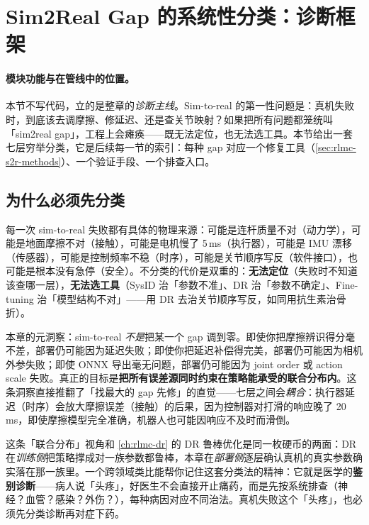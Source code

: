 \section{Sim2Real Gap 的系统性分类：诊断框架}
\label{sec:rlmc-s2r-taxonomy}

\paragraph{模块功能与在管线中的位置。}本节不写代码，立的是整章的\emph{诊断主线}。Sim-to-real 的第一性问题是：真机失败时，到底该去调摩擦、修延迟、还是查关节映射？如果把所有问题都笼统叫「sim2real gap」，工程上会瘫痪——既无法定位，也无法选工具。本节给出一套七层穷举分类，它是后续每一节的索引：每种 gap 对应一个修复工具（\cref{sec:rlmc-s2r-methods}）、一个验证手段、一个排查入口。

\subsection{为什么必须先分类}
\label{sec:rlmc-s2r-why-taxonomy}

每一次 sim-to-real 失败都有具体的物理来源：可能是连杆质量不对（动力学），可能是地面摩擦不对（接触），可能是电机慢了 5\,ms（执行器），可能是 IMU 漂移（传感器），可能是控制频率不稳（时序），可能是关节顺序写反（软件接口），也可能是根本没有急停（安全）。不分类的代价是双重的：\textbf{无法定位}（失败时不知道该查哪一层），\textbf{无法选工具}（SysID 治「参数不准」、DR 治「参数不确定」、Fine-tuning 治「模型结构不对」——用 DR 去治关节顺序写反，如同用抗生素治骨折）。

\begin{insight}\label{ins:rlmc-s2r-joint}
本章的元洞察：sim-to-real \emph{不是}把某一个 gap 调到零。即使你把摩擦辨识得分毫不差，部署仍可能因为延迟失败；即使你把延迟补偿得完美，部署仍可能因为相机外参失败；即使 ONNX 导出毫无问题，部署仍可能因为 joint order 或 action scale 失败。真正的目标是\textbf{把所有误差源同时约束在策略能承受的联合分布内}。这条洞察直接推翻了「找最大的 gap 先修」的直觉——七层之间会\emph{耦合}：执行器延迟（时序）会放大摩擦误差（接触）的后果，因为控制器对打滑的响应晚了 20\,ms，即使摩擦模型完全准确，机器人也可能因响应不及时而滑倒。
\end{insight}

这条「联合分布」视角和 \cref{ch:rlmc-dr} 的 DR 鲁棒优化是同一枚硬币的两面：DR 在\emph{训练侧}把策略撑成对一族参数都鲁棒，本章在\emph{部署侧}逐层确认真机的真实参数确实落在那一族里。一个跨领域类比能帮你记住这套分类法的精神：它就是医学的\textbf{鉴别诊断}——病人说「头疼」，好医生不会直接开止痛药，而是先按系统排查（神经？血管？感染？外伤？），每种病因对应不同治法。真机失败这个「头疼」，也必须先分类诊断再对症下药。

